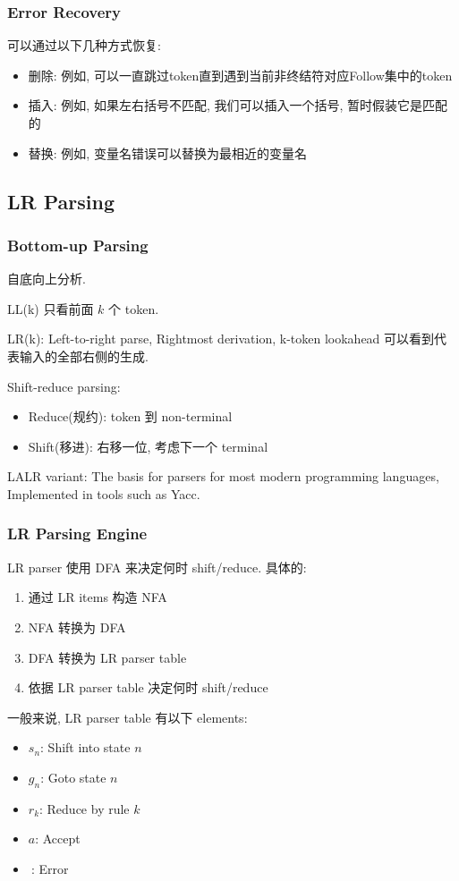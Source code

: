 \subsubsection{Error Recovery}
可以通过以下几种方式恢复: 
\begin{itemize}
    \item 删除: 例如, 可以一直跳过token直到遇到当前非终结符对应Follow集中的token
    \item 插入: 例如, 如果左右括号不匹配, 我们可以插入一个括号, 暂时假装它是匹配的
    \item 替换: 例如, 变量名错误可以替换为最相近的变量名
\end{itemize}

\subsection{LR Parsing}
\subsubsection{Bottom-up Parsing}
自底向上分析.

LL(k) 只看前面 $k$ 个 token.

LR(k): Left-to-right parse, Rightmost derivation, k-token lookahead 可以看到代表输入的全部右侧的生成.

Shift-reduce parsing:
\begin{itemize}
    \item Reduce(规约): token 到 non-terminal
    \item Shift(移进): 右移一位, 考虑下一个 terminal
\end{itemize}

LALR variant: The basis for parsers for most modern programming languages, Implemented in tools such as Yacc.

\subsubsection{LR Parsing Engine}
LR parser 使用 DFA 来决定何时 shift/reduce. 具体的:
\begin{enumerate}
    \item 通过 LR items 构造 NFA
    \item NFA 转换为 DFA
    \item DFA 转换为 LR parser table
    \item 依据 LR parser table 决定何时 shift/reduce
\end{enumerate}


一般来说, LR parser table 有以下 elements:
\begin{itemize}
    \item $s_n$: Shift into state $n$
    \item $g_n$: Goto state $n$
    \item $r_k$: Reduce by rule $k$
    \item $a$: Accept
    \item $\ $: Error 
\end{itemize}

